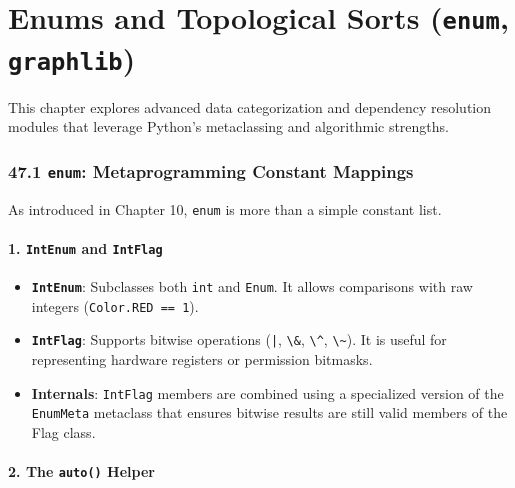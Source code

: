 \hypertarget{enums-and-topological-sorts-enum-graphlib}{%
\chapter{\texorpdfstring{Enums and Topological Sorts (\texttt{enum},
\texttt{graphlib})}{Enums and Topological Sorts (enum, graphlib)}}\label{enums-and-topological-sorts-enum-graphlib}}

This chapter explores advanced data categorization and dependency
resolution modules that leverage Python's metaclassing and algorithmic
strengths.

\hypertarget{enum-metaprogramming-constant-mappings}{%
\subsection{\texorpdfstring{47.1 \texttt{enum}: Metaprogramming Constant
Mappings}{47.1 enum: Metaprogramming Constant Mappings}}\label{enum-metaprogramming-constant-mappings}}

As introduced in Chapter 10, \passthrough{\lstinline!enum!} is more than
a simple constant list.

\hypertarget{intenum-and-intflag}{%
\subsubsection{\texorpdfstring{1. \texttt{IntEnum} and
\texttt{IntFlag}}{1. IntEnum and IntFlag}}\label{intenum-and-intflag}}

\begin{itemize}
\tightlist
\item
  \textbf{\passthrough{\lstinline!IntEnum!}}: Subclasses both
  \passthrough{\lstinline!int!} and \passthrough{\lstinline!Enum!}. It
  allows comparisons with raw integers
  (\passthrough{\lstinline!Color.RED == 1!}).
\item
  \textbf{\passthrough{\lstinline!IntFlag!}}: Supports bitwise
  operations (\passthrough{\lstinline!|!}, \passthrough{\lstinline!\&!},
  \passthrough{\lstinline!\^!}, \passthrough{\lstinline!\~!}). It is
  useful for representing hardware registers or permission bitmasks.
\item
  \textbf{Internals}: \passthrough{\lstinline!IntFlag!} members are
  combined using a specialized version of the
  \passthrough{\lstinline!EnumMeta!} metaclass that ensures bitwise
  results are still valid members of the Flag class.
\end{itemize}

\hypertarget{the-auto-helper}{%
\subsubsection{\texorpdfstring{2. The \texttt{auto()}
Helper}{2. The auto() Helper}}\label{the-auto-helper}}

